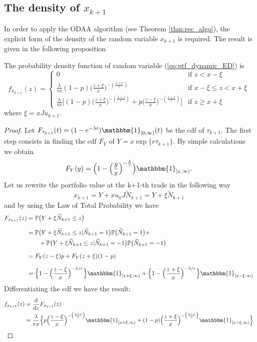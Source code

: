 \subsection{The density of $x_{k+1}$}
In order to apply the ODAA algorithm (see Theorem \ref{thm:rec_algo}), the explicit form of the density of the random variable $x_{k+1}$ is required. The result is given in the following proposition
\begin{proposition}\label{prop:density_portfolio_basic}
	The probability density function of random variable (\ref{eq:ptf_dynamic_ED}) is
	\begin{equation*}
	f_{x_{k+1}}(z)= 
	\begin{cases}
	0         & \text{if } z < x-\xi \\[1ex]  
	\frac{\lambda}{r x}(1-p)\big(\frac{z+\xi}{x}\big)^{-(\frac{\lambda+r}{r})} & \text{if } x-\xi \leq z < x+\xi \\[1ex]  
	\frac{\lambda}{r x}\big[(1-p)\big(\frac{z+\xi}{x}\big)^{-(\frac{\lambda+r}{r})} + p \big(\frac{z-\xi}{x}\big)^{-(\frac{\lambda+r}{r})}\big]   & \text{if } z \geq x+\xi
	\end{cases}
	\end{equation*}
	where $\xi=xJu_{k+1}$.
\end{proposition}
\begin{proof}
	Let $F_{\tau_{k+1}}(t)= (1-e^{-\lambda t})\mathbbm{1}_{[0,\infty)}(t)$ be the cdf of $\tau_{k+1}$. The first step consists in finding the cdf $F_Y$ of $Y=x\exp\{r \tau_{k+1}\}$. By simple calculations we obtain
	\[F_Y(y)=\Big(1-\Big(\frac{y}{x}\Big)^{-\frac{\lambda}{r}}\Big)\mathbbm{1}_{[x,\infty)}. \]
	Let us rewrite the portfolio value at the k+1-th trade in the following way \[ x_{k+1} = Y + xu_kJ\widetilde{N}_{k+1}=Y+\xi \widetilde{N}_{k+1} \]
	and by using the Law of Total Probability we have
	\begin{align*}
	F_{x_{k+1}}(z) & = \mathbb{P}\big(Y+\xi \widetilde{N}_{k+1}\leq z\big)\\[1.5ex]
	& = \mathbb{P}\big(Y+\xi \widetilde{N}_{k+1}\leq z\lvert \widetilde{N}_{k+1}=1\big)\mathbb{P}\big(\widetilde{N}_{k+1}=1\big)+\\
	&\qquad +\mathbb{P}\big(Y+\xi \widetilde{N}_{k+1}\leq z\lvert \widetilde{N}_{k+1}=-1\big)\mathbb{P}\big(\widetilde{N}_{k+1}=-1\big)\\[1.5ex]
	& = F_Y(z-\xi)p+F_Y(z+\xi)(1-p)\\[1.5ex]
	& = \Big\{1-\Big(\frac{z-\xi}{x}\Big)^{-\lambda/r} \Big\}\mathbbm{1}_{[x+\xi,\infty)}+
	\Big\{1-\Big(\frac{z+\xi}{x}\Big)^{-\lambda/r} \Big\}\mathbbm{1}_{[x-\xi,\infty)}
	\end{align*}
	Differentiating the cdf we have the result:
	\begin{align*}
	f_{x_{k+1}}(z) & = \frac{\mathrm{d}}{\mathrm{d}z}F_{x_{k+1}}(z)\\
	& = \frac{\lambda}{r x}\Big\{p\Big(\frac{z-\xi}{x}\Big)^{-\big(\frac{\lambda+r}{r}\big)}\mathbbm{1}_{[x+\xi,\infty)} + 
	(1-p)\Big(\frac{z+\xi}{x}\Big)^{-\big(\frac{\lambda+r}{r}\big)}\mathbbm{1}_{[x-\xi,\infty)}\Big\}
	\end{align*}
\end{proof}


